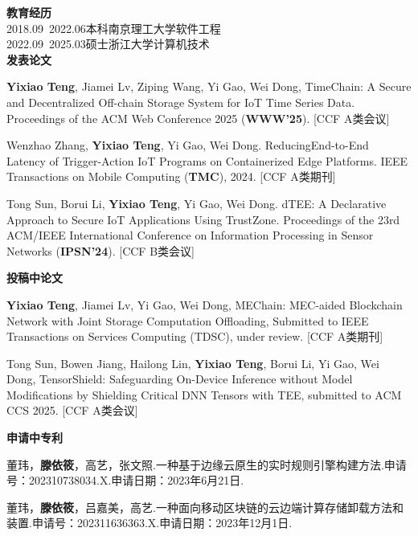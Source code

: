 \cleardoublepage
{}
\noindent\textbf{教育经历}\\
2018.09~2022.06\quad  本科\quad  南京理工大学\quad  软件工程\\
2022.09~2025.03\quad  硕士\quad  浙江大学\quad \quad \quad  计算机技术\\


\noindent\textbf{发表论文}
\begin{enumerate}[label={[\arabic*]},leftmargin=*]
\item \textbf{Yixiao Teng}, Jiamei Lv, Ziping Wang, Yi Gao, Wei Dong, TimeChain: A Secure and Decentralized Off-chain Storage System for IoT Time Series Data. Proceedings of the ACM Web Conference 2025 (\textbf{WWW'25}). [CCF A类会议]
\item Wenzhao Zhang, \textbf{Yixiao Teng}, Yi Gao, Wei Dong. ReducingEnd-to-End Latency of Trigger-Action IoT Programs on Containerized Edge Platforms. IEEE Transactions on Mobile Computing (\textbf{TMC}), 2024. [CCF A类期刊]
\item Tong Sun, Borui Li, \textbf{Yixiao Teng}, Yi Gao, Wei Dong. dTEE: A Declarative Approach to Secure IoT Applications Using TrustZone. Proceedings of the 23rd ACM/IEEE International Conference on Information Processing in Sensor Networks (\textbf{IPSN'24}). [CCF B类会议]\\
\end{enumerate}

\noindent\textbf{投稿中论文}
\begin{enumerate}[label={[\arabic*]},leftmargin=*]
    \item \textbf{Yixiao Teng}, Jiamei Lv, Yi Gao, Wei Dong, MEChain: MEC-aided Blockchain Network with Joint Storage Computation Offloading, Submitted to IEEE Transactions on Services Computing (TDSC), under review. [CCF A类期刊]
    \item Tong Sun, Bowen Jiang, Hailong Lin, \textbf{Yixiao Teng}, Borui Li, Yi Gao, Wei Dong, TensorShield: Safeguarding On-Device Inference without Model Modifications by Shielding Critical DNN Tensors with TEE, submitted to ACM CCS 2025. [CCF A类会议]\\
\end{enumerate}

\noindent\textbf{申请中专利}
\begin{enumerate}[label={[\arabic*]},leftmargin=*]
    \item 董玮，\textbf{滕依筱}，高艺，张文照.一种基于边缘云原生的实时规则引擎构建方法.申请号：202310738034.X.申请日期：2023年6月21日.
    \item 董玮，\textbf{滕依筱}，吕嘉美，高艺.一种面向移动区块链的云边端计算存储卸载方法和装置.申请号：202311636363.X.申请日期：2023年12月1日.
\end{enumerate}